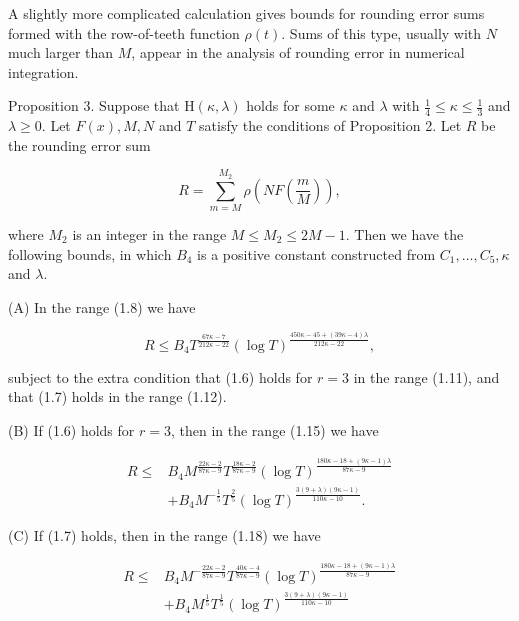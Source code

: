 \documentclass[10pt]{article}
\begin{document}
A slightly more complicated calculation gives bounds for rounding error sums formed with the row-of-teeth function $\rho(t)$. Sums of this type, usually with $N$ much larger than $M$, appear in the analysis of rounding error in numerical integration.

Proposition 3. Suppose that $\mathrm{H}(\kappa, \lambda)$ holds for some $\kappa$ and $\lambda$ with $\frac{1}{4} \leqslant \kappa \leqslant \frac{1}{3}$ and $\lambda \geqslant 0$. Let $F(x), M, N$ and $T$ satisfy the conditions of Proposition 2. Let $R$ be the rounding error sum

$$
R=\sum_{m=M}^{M_{2}} \rho\left(N F\left(\frac{m}{M}\right)\right),
$$

where $M_{2}$ is an integer in the range $M \leqslant M_{2} \leqslant 2 M-1$. Then we have the following bounds, in which $B_{4}$ is a positive constant constructed from $C_{1}, \ldots, C_{5}, \kappa$ and $\lambda$.

(A) In the range (1.8) we have


\begin{equation*}
R \leqslant B_{4} T^{\frac{67 \kappa-7}{212 \kappa-22}}(\log T)^{\frac{450 \kappa-45+(39 \kappa-4) \lambda}{212 \kappa-22}}, \tag{1.25}
\end{equation*}


subject to the extra condition that (1.6) holds for $r=3$ in the range (1.11), and that (1.7) holds in the range (1.12).

(B) If (1.6) holds for $r=3$, then in the range (1.15) we have


\begin{align*}
R \leqslant & B_{4} M^{\frac{22 \kappa-2}{87 \kappa-9}} T^{\frac{18 \kappa-2}{87 \kappa-9}}(\log T)^{\frac{180 \kappa-18+(9 \kappa-1) \lambda}{87 \kappa-9}} \\
& +B_{4} M^{-\frac{1}{5}} T^{\frac{2}{5}}(\log T)^{\frac{3(9+\lambda)(9 \kappa-1)}{110 \kappa-10}}. \tag{1.26}
\end{align*}


(C) If (1.7) holds, then in the range (1.18) we have


\begin{align*}
R \leqslant & B_{4} M^{-\frac{22 \kappa-2}{87 \kappa-9}} T^{\frac{40 \kappa-4}{87 \kappa-9}}(\log T)^{\frac{180 \kappa-18+(9 \kappa-1) \lambda}{87 \kappa-9}} \\
& +B_{4} M^{\frac{1}{5}} T^{\frac{1}{5}}(\log T)^{\frac{3(9+\lambda)(9 \kappa-1)}{110 \kappa-10}} \tag{1.27}
\end{align*}
\end{document}
